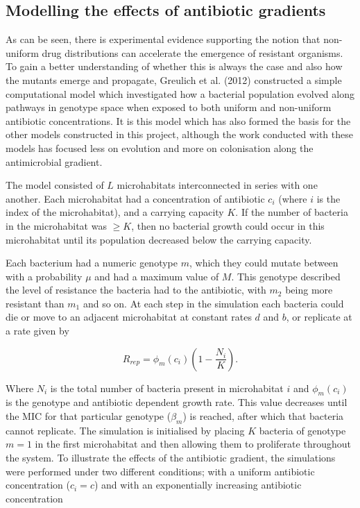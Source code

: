 \documentclass[a4paper,12pt]{article}
\begin{document}
\subsection{Modelling the effects of antibiotic gradients} \label{subsec:modelling-gradients}


As can be seen, there is experimental evidence supporting the notion that non-uniform drug distributions can accelerate the emergence of resistant organisms.  To gain 
a better understanding of whether this is always the case and also how the mutants emerge and propagate,  Greulich et al. (2012) 
\cite{bioref:PRL-drugGradients} constructed a simple computational model which investigated how a bacterial population evolved along pathways 
in genotype space when exposed to both uniform and non-uniform antibiotic concentrations.  It is this model which has also formed the basis for the other models
constructed in this project, although the work conducted with these models has focused less on evolution and more on colonisation along the antimicrobial gradient.

The model consisted of $L$ microhabitats interconnected in series with one another.  Each microhabitat had a concentration of antibiotic $c_i$ (where $i$ is the index of the 
microhabitat), and a carrying capacity $K$.  If the number of bacteria in the microhabitat was $\geq{K}$, then no bacterial growth could occur in this microhabitat until its population 
decreased below the carrying capacity.  

Each bacterium had a numeric genotype $m$, which they could mutate between with a probability $\mu$ 
and had a maximum value of $M$.  This genotype described the level of resistance the bacteria had to the antibiotic, with $m_2$ being more resistant than $m_1$ and so on.  
At each step in the simulation each bacteria could die or move to an adjacent microhabitat at constant rates $d$ and $b$, or replicate at a rate given by 

\begin{equation}
 R_{rep} = \phi_m(c_i)(1 - \frac{N_i}{K}).
 \label{eqn:R_rep}
\end{equation}

Where $N_i$ is the total number of bacteria present in microhabitat $i$ and $\phi_m(c_i)$ is the genotype and antibiotic dependent growth rate.  
This value decreases until the MIC for that particular genotype ($\beta_m$) is reached, after which that bacteria cannot replicate.  The simulation is 
initialised by placing $K$ bacteria of genotype $m=1$ in the first microhabitat and then allowing them to proliferate throughout the system.  To illustrate the effects 
of the antibiotic gradient, the simulations were performed under two different conditions; with a uniform antibiotic concentration ($c_i = c$) and with an exponentially 
increasing antibiotic concentration
\end{document}
